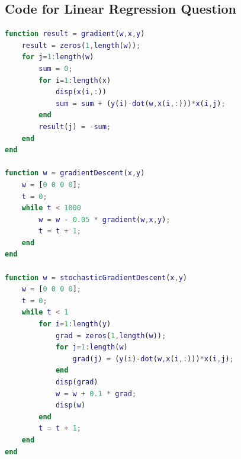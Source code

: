 \documentclass[12pt, fullpage,letterpaper]{article}
\begin{document}
\subsection{Code for Linear Regression Question}
\begin{lstlisting}[language=Matlab]
function result = gradient(w,x,y)
    result = zeros(1,length(w));
    for j=1:length(w)
        sum = 0;
        for i=1:length(x)
            disp(x(i,:))
            sum = sum + (y(i)-dot(w,x(i,:)))*x(i,j);
        end
        result(j) = -sum;
    end
end

function w = gradientDescent(x,y)
    w = [0 0 0 0];
    t = 0;
    while t < 1000
        w = w - 0.05 * gradient(w,x,y);
        t = t + 1;
    end
end

function w = stochasticGradientDescent(x,y)
    w = [0 0 0 0];
    t = 0;
    while t < 1
        for i=1:length(y)
            grad = zeros(1,length(w));
            for j=1:length(w)
                grad(j) = (y(i)-dot(w,x(i,:)))*x(i,j);
            end
            disp(grad)
            w = w + 0.1 * grad;
            disp(w)
        end
        t = t + 1;
    end
end
\end{lstlisting}
\end{document}
